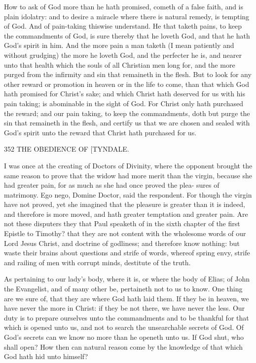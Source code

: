 \documentclass{custom}
\begin{document}
{How to ask of God more than he hath promised, 
cometh of a false faith, and is plain idolatry: and to 
desire a miracle where there is natural remedy, is tempting 
of God. And of pain-taking thiswise understand. He 
that taketh pains, to keep the commandments of God, is 
sure thereby that he loveth God, and that he hath God's 
spirit in him. And the more pain a man taketh (I mean
patiently and without grudging) the more he loveth God,
and the perfecter he is, and nearer unto that health which 
the souls of all Christian men long for, and the more purged 
from the infirmity and sin that remaineth in the flesh. But 
to look for any other reward or promotion in heaven or in 
the life to come, than that which God hath promised for 
Christ's sake; and which Christ hath deserved for us with 
his pain taking; is abominable in the sight of God. For 
Christ only hath purchased the reward; and our pain taking, 
to keep the commandments, doth but purge the sin that 
remaineth in the flesh, and certify us that we are chosen 
and sealed with God's spirit unto the reward that Christ 
hath purchased for us. 


352
THE OBEDIENCE OF
[TYNDALE.

I was once at the creating of Doctors of Divinity, where 
the opponent brought the same reason to prove that the 
widow had more merit than the virgin, because she had 
greater pain, for as much as she had once proved the plea- 
sures of matrimony. Ego nego, Domine Doctor, said the 
respondent. For though the virgin have not proved, yet 
she imagined that the pleasure is greater than it is indeed, 
and therefore is more moved, and hath greater temptation 
and greater pain. Are not these disputers they that Paul 
speaketh of in the sixth chapter of the first Epistle to 
Timothy? that they are not content with the wholesome 
words of our Lord Jesus Christ, and doctrine of godliness; 
and therefore know nothing: but waste their brains 
about questions and strife of words, whereof spring envy, 
strife and railing of men with corrupt minds, destitute of 
the truth. 

As pertaining to our lady's body, where it is, or where 
the body of Elias; of John the Evangelist, and of many 
other be, pertaineth not to us to know. One thing are 
we sure of, that they are where God hath laid them. If 
they be in heaven, we have never the more in Christ: if 
they be not there, we have never the less. Our duty is to 
prepare ourselves unto the commandments and to be 
thankful for that which is opened unto us, and not to search 
the unsearchable secrets of God. Of God's secrets can 
we know no more than he openeth unto us. If God shut, 
who shall open? How then can natural reason come by 
the knowledge of that which God hath hid unto himself? 

}
\end{document}

